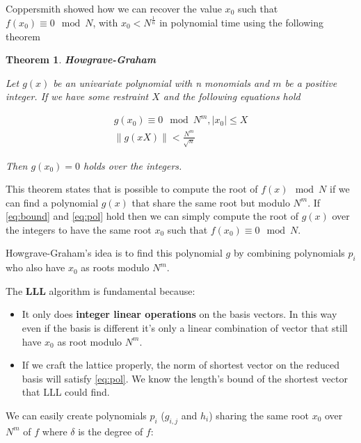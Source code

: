 \documentclass[a4paper,12pt]{report}
\newtheorem{theorem}{Theorem}[section]
\begin{document}
Coppersmith showed how we can recover the value $x_0$ such that $f(x_0) \equiv 0 \mod N$, with $x_0 < N^{\frac{1}{n}}$ in polynomial time
using the following theorem

\begin{theorem}
    \textbf{Howgrave-Graham}
\end{theorem}

\textit{Let $g(x)$ be an univariate polynomial with n monomials and $m$ be a positive integer.
    If we have some restraint $X$ and the following equations hold}

\begin{center}
    \begin{eqnarray}
        g(x_0) \equiv 0 \mod N^m, |x_0| \le X \label{eq:bound} \\
         \lVert g(xX) \rVert < \frac{N^m}{\sqrt{n}} \label{eq:pol}
    \end{eqnarray}
\end{center}

\textit{Then $g(x_0) = 0$ holds over the integers.}

\vspace*{10px}

This theorem states that is possible to compute the root of $f(x) \mod N$ if we can find a polynomial $g(x)$ that share the same root but modulo $N^m$.
If \ref{eq:bound} and \ref{eq:pol} hold then we can simply compute the root of $g(x)$ over the integers to have the same root $x_0$
such that $f(x_0) \equiv 0 \mod N$.

Howgrave-Graham's idea is to find this polynomial $g$ by combining polynomials $p_i$ who also have $x_0$ as roots modulo $N^m$.

\vspace*{10px}

The \textbf{LLL} algorithm is fundamental because:

\begin{itemize}
    \item It only does \textbf{integer linear operations} on the basis vectors.
        In this way even if the basis is different it's only a linear combination of vector that still have $x_0$ as root
        modulo $N^m$.
    \item If we craft the lattice properly, the norm of shortest vector on the reduced basis will satisfy \ref{eq:pol}.
        We know the length's bound of the shortest vector that LLL could find.
\end{itemize}

We can easily create polynomials $p_i$ ($g_{i,j}$ and $h_i$)  sharing the same root $x_0$ over $N^m$ of $f$ where $\delta$ is the degree of $f$:
\end{document}
